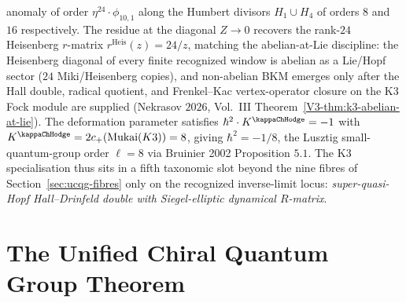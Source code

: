 \begin{remark}
anomaly of order $\eta^{24}\cdot\phi_{10,1}$ along the Humbert divisors
$H_1\cup H_4$ of orders $8$ and $16$ respectively. The residue at the
diagonal $Z\to 0$ recovers the rank-$24$ Heisenberg $r$-matrix
$r^{\mathrm{Heis}}(z) = 24/z$, matching the abelian-at-Lie discipline:
the Heisenberg diagonal of every finite recognized window is abelian
as a Lie/Hopf sector ($24$ Miki/Heisenberg copies), and non-abelian
BKM emerges only after the Hall double, radical quotient, and
Frenkel--Kac vertex-operator closure on the K3 Fock module are supplied
(Nekrasov $2026$, Vol.~III
Theorem~\ref{V3-thm:k3-abelian-at-lie}). The deformation parameter satisfies
$\hbar^2 \cdot K^{\kappaChHodge} = -1$ with
$K^{\kappaChHodge} = 2c_+(\mathrm{Mukai}(K3)) = 8$, giving
$\hbar^2 = -1/8$, the Lusztig small-quantum-group order $\ell=8$ via
Bruinier 2002 Proposition $5.1$. The K3 specialisation thus sits in a
fifth taxonomic slot beyond the nine fibres of
Section~\ref{sec:ucqg-fibres} only on the recognized inverse-limit
locus: \emph{super-quasi-Hopf Hall--Drinfeld double with
Siegel-elliptic dynamical $R$-matrix}.
\end{remark}

\section{The Unified Chiral Quantum Group Theorem}
\label{sec:ucqg-main-theorem}

